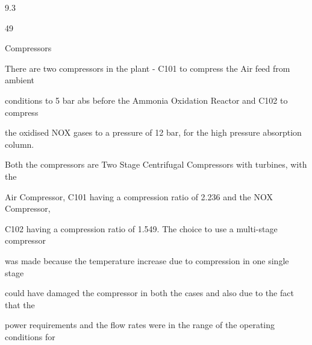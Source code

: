 \documentclass[a4paper,portrait,12pt]{article}
\begin{document}
9.3





49





\begin{flushleft}
Compressors
\end{flushleft}





\begin{flushleft}
There are two compressors in the plant - C101 to compress the Air feed from ambient
\end{flushleft}


\begin{flushleft}
conditions to 5 bar abs before the Ammonia Oxidation Reactor and C102 to compress
\end{flushleft}


\begin{flushleft}
the oxidised NOX gases to a pressure of 12 bar, for the high pressure absorption column.
\end{flushleft}


\begin{flushleft}
Both the compressors are Two Stage Centrifugal Compressors with turbines, with the
\end{flushleft}


\begin{flushleft}
Air Compressor, C101 having a compression ratio of 2.236 and the NOX Compressor,
\end{flushleft}


\begin{flushleft}
C102 having a compression ratio of 1.549. The choice to use a multi-stage compressor
\end{flushleft}


\begin{flushleft}
was made because the temperature increase due to compression in one single stage
\end{flushleft}


\begin{flushleft}
could have damaged the compressor in both the cases and also due to the fact that the
\end{flushleft}


\begin{flushleft}
power requirements and the flow rates were in the range of the operating conditions for
\end{flushleft}
\end{document}
